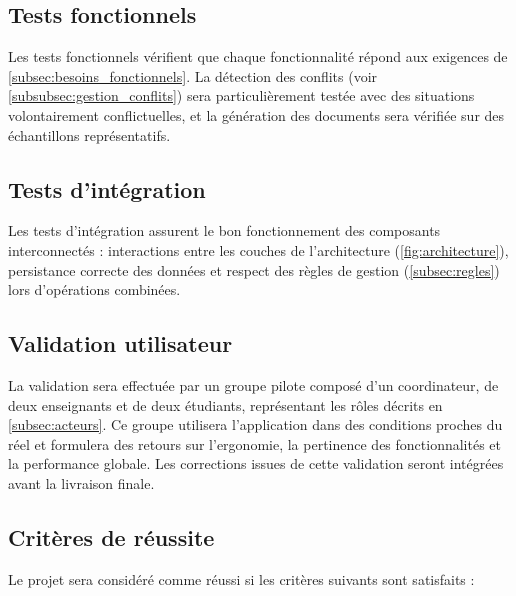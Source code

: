 \documentclass[12pt,a4paper]{article}
\begin{document}
\subsection{Tests fonctionnels}
\label{subsec:tests_fonctionnels}

Les tests fonctionnels vérifient que chaque fonctionnalité répond aux exigences
de \ref{subsec:besoins_fonctionnels}. La détection des conflits (voir
\ref{subsubsec:gestion_conflits}) sera particulièrement testée avec des
situations volontairement conflictuelles, et la génération des documents sera
vérifiée sur des échantillons représentatifs.

\subsection{Tests d'intégration}
\label{subsec:tests_integration}
Les tests d'intégration assurent le bon fonctionnement
des composants interconnectés : interactions entre les couches de l'architecture
(\ref{fig:architecture}), persistance correcte des données et respect des règles de gestion
(\ref{subsec:regles}) lors d'opérations combinées.

\subsection{Validation utilisateur}
\label{subsec:validation_utilisateur}

La validation sera effectuée par un groupe pilote composé d'un coordinateur, de
deux enseignants et de deux étudiants, représentant les rôles décrits en
\ref{subsec:acteurs}. Ce groupe utilisera l'application dans des conditions
proches du réel et formulera des retours sur l'ergonomie, la pertinence des
fonctionnalités et la performance globale. Les corrections issues de cette
validation seront intégrées avant la livraison finale.

\subsection{Critères de réussite}
\label{subsec:criteres_reussite}

Le projet sera considéré comme réussi si les critères suivants sont satisfaits :
\end{document}

